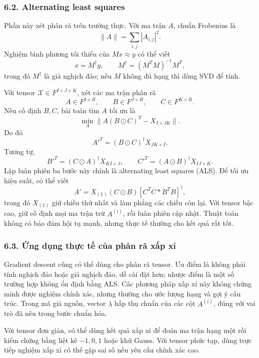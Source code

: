 \documentclass[11pt]{article}
\begin{document}
\subsubsection*{6.2. Alternating least squares}

Phần này xét phân rã trên trường thực. Với ma trận \(A\), chuẩn Frobenius là
\[
  \|A\|=\sum_{i,j}|A_{i,j}|^2.
\]
Nghiệm bình phương tối thiểu của \(Mx\approx y\) có thể viết
\[
  x=M^\dagger y,\qquad M^\dagger=(M^T M)^{-1}M^T,
\]
trong đó \(M^\dagger\) là giả nghịch đảo; nếu \(M\) không đủ hạng thì dùng
SVD để tính.

Với tensor \(\mathcal X\in F^{I\times J\times K}\), xét các ma trận phân rã
\[
  A\in F^{I\times R},\qquad B\in F^{J\times R},\qquad C\in F^{K\times R}.
\]
Nếu cố định \(B,C\), bài toán tìm \(A\) tối ưu là
\[
  \min_A\|A(B\odot C)^T-X_{I\times JK}\|.
\]
Do đó
\[
  A'^T=(B\odot C)^\dagger X_{JK\times I}.
\]
Tương tự,
\[
  B'^T=(C\odot A)^\dagger X_{KI\times J},\qquad
  C'^T=(A\odot B)^\dagger X_{IJ\times K}.
\]
Lặp luân phiên ba bước này chính là alternating least squares (ALS). Để tối ưu
hiệu suất, có thể viết
\[
  A'=X_{(1)}(C\odot B)[C^T C * B^T B]^\dagger,
\]
trong đó \(X_{(1)}\) giữ chiều thứ nhất và làm phẳng các chiều còn lại. Với
tensor bậc cao, giữ cố định mọi ma trận trừ \(A^{(i)}\), rồi luân phiên cập
nhật. Thuật toán không có bảo đảm hội tụ mạnh, nhưng thực tế thường cho kết
quả rất tốt.

\begin{center}
\end{center}

\subsubsection*{6.3. Ứng dụng thực tế của phân rã xấp xỉ}

Gradient descent cũng có thể dùng cho phân rã tensor. Ưu điểm là không phải
tính nghịch đảo hoặc giả nghịch đảo, dễ cài đặt hơn; nhược điểm là một số
trường hợp không ổn định bằng ALS. Các phương pháp xấp xỉ này không chứng minh
được nghiệm chính xác, nhưng thường cho ước lượng hạng và gợi ý cấu trúc.
Trong mã giả nguồn, vector \(\lambda\) hấp thụ chuẩn của các cột
\(A^{(i)}\), đúng với vai trò đã nêu trong bước chuẩn hóa.

Với tensor đơn giản, có thể dùng kết quả xấp xỉ để đoán ma trận hạng một rồi
kiểm chứng bằng liệt kê \(-1,0,1\) hoặc khử Gauss. Với tensor phức tạp, dùng
trực tiếp nghiệm xấp xỉ có thể gặp sai số nếu yêu cầu chính xác cao.
\end{document}

